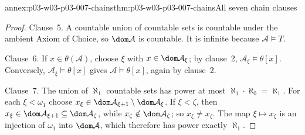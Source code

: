 \begin{annexitem}{annex:p03-w03-p03-007-chains}{thm:p03-w03-p03-007-chains}{All seven chain clauses}
\begin{proof}
Clause~5. A countable union of countable sets is countable under the ambient
Axiom of Choice, so \(\dom\mathcal A\) is countable. It is infinite because
\(\mathcal A\models T\).

Clause~6. If \(x\in\theta(\mathcal A)\), choose \(\xi\) with
\(x\in\dom\mathcal A_\xi\); by clause~2, \(\mathcal A_\xi\models\theta[x]\).
Conversely, \(\mathcal A_\xi\models\theta[x]\) gives
\(\mathcal A\models\theta[x]\), again by clause~2.

Clause~7. The union of \(\aleph_1\) countable sets has power at most
\(\aleph_1\cdot\aleph_0=\aleph_1\). For each \(\xi<\omega_1\) choose
\(x_\xi\in\dom\mathcal A_{\xi+1}\setminus\dom\mathcal A_\xi\). If
\(\xi<\zeta\), then \(x_\xi\in\dom\mathcal A_{\xi+1}\subseteq\dom\mathcal A_\zeta\),
while \(x_\zeta\notin\dom\mathcal A_\zeta\); so \(x_\xi\neq x_\zeta\). The map
\(\xi\mapsto x_\xi\) is an injection of \(\omega_1\) into \(\dom\mathcal A\),
which therefore has power exactly \(\aleph_1\).
\end{proof}
\end{annexitem}

